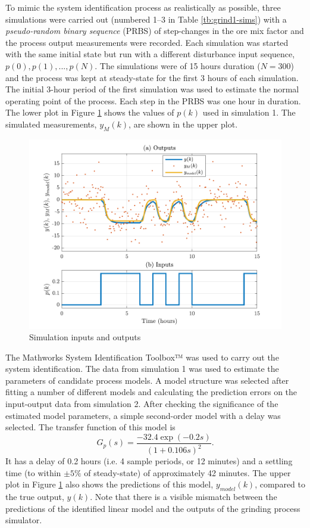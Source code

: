 To mimic the system identification process as realistically as possible, three simulations were carried out (numbered 1--3 in Table \ref{tb:grind1-sims}) with a \textit{pseudo-random binary sequence} (\gls{PRBS}) of step-changes in the ore mix factor and the process output measurements were recorded. Each simulation was started with the same initial state but run with a different disturbance input sequence, $p(0), p(1), ..., p(N)$. The simulations were of 15 hours duration ($N=300$) and the process was kept at steady-state for the first 3 hours of each simulation. The initial 3-hour period of the first simulation was used to estimate the normal operating point of the process. Each step in the \gls{PRBS} was one hour in duration. The lower plot in Figure \ref{fig:grind1-sim_ioplots} shows the values of $p(k)$ used in simulation 1. The simulated measurements, $y_M(k)$, are shown in the upper plot.
\begin{figure}[htp]
	\centering
	\includegraphics[width=13cm]{images/grind1_rod_obs_sim_1_ioplot_P2DcTd4.pdf}
	\caption{Simulation inputs and outputs}
	\label{fig:grind1-sim_ioplots}
\end{figure}

The Mathworks System Identification Toolbox™ was used to carry out the system identification. The data from simulation 1 was used to estimate the parameters of candidate process models. A model structure was selected after fitting a number of different models and calculating the prediction errors on the input-output data from simulation 2. After checking the significance of the estimated model parameters, a simple second-order model with a delay was selected. The transfer function of this model is
\begin{equation} \label{eq:grind1-id-model-ctf}
	G_p(s)= \frac{-32.4\exp(-0.2s)}{(1 + 0.106s)^2}.
\end{equation}
It has a delay of 0.2 hours (i.e. 4 sample periods, or 12 minutes) and a settling time (to within $\pm5\%$ of steady-state) of approximately 42 minutes. The upper plot in Figure \ref{fig:grind1-sim_ioplots} also shows the predictions of this model, $y_{model}(k)$, compared to the true output, $y(k)$. Note that there is a visible mismatch between the predictions of the identified linear model and the outputs of the grinding process simulator.

